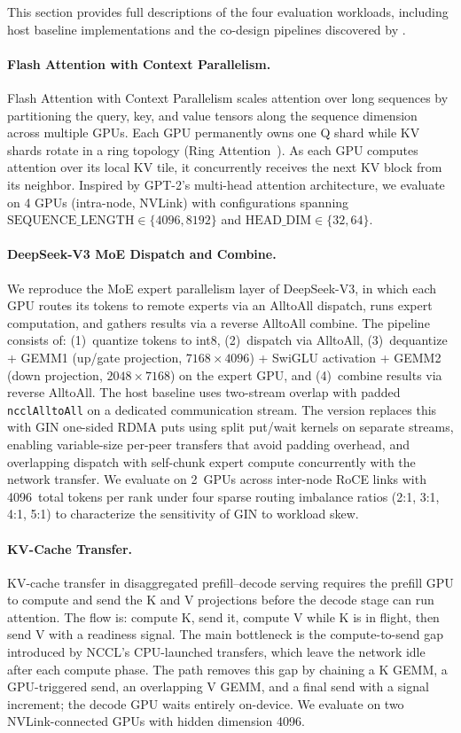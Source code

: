 This section provides full descriptions of the four evaluation workloads, including host baseline implementations and the co-design pipelines discovered by \cufuse{}.

\paragraph{Flash Attention with Context Parallelism.}
Flash Attention with Context Parallelism scales attention over long sequences by partitioning the query, key, and value tensors along the sequence dimension across multiple GPUs. Each GPU permanently owns one Q shard while KV shards rotate in a ring topology (Ring Attention~\cite{liu2024ringattention}). As each GPU computes attention over its local KV tile, it concurrently receives the next KV block from its neighbor. Inspired by GPT-2's multi-head attention architecture, we evaluate on 4 GPUs (intra-node, NVLink) with configurations spanning $\text{SEQUENCE\_LENGTH} \in \{4096, 8192\}$ and $\text{HEAD\_DIM} \in \{32, 64\}$.

\paragraph{DeepSeek-V3 MoE Dispatch and Combine.}
We reproduce the MoE expert parallelism layer of DeepSeek-V3, in which each GPU routes its tokens to remote experts via an AlltoAll dispatch, runs expert computation, and gathers results via a reverse AlltoAll combine. The pipeline consists of: (1)~quantize tokens to int8, (2)~dispatch via AlltoAll, (3)~dequantize + GEMM1 (up/gate projection, $7168 \times 4096$) + SwiGLU activation + GEMM2 (down projection, $2048 \times 7168$) on the expert GPU, and (4)~combine results via reverse AlltoAll. The host baseline uses two-stream overlap with padded \texttt{ncclAlltoAll} on a dedicated communication stream. The \cufuse{} version replaces this with GIN one-sided RDMA puts using split put/wait kernels on separate streams, enabling variable-size per-peer transfers that avoid padding overhead, and overlapping dispatch with self-chunk expert compute concurrently with the network transfer. We evaluate on 2~GPUs across inter-node RoCE links with 4096~total tokens per rank under four sparse routing imbalance ratios (2:1, 3:1, 4:1, 5:1) to characterize the sensitivity of GIN to workload skew.

\paragraph{KV-Cache Transfer.}
KV-cache transfer in disaggregated prefill--decode serving requires the prefill GPU to compute and send the K and V projections before the decode stage can run attention. The flow is: compute K, send it, compute V while K is in flight, then send V with a readiness signal. The main bottleneck is the compute-to-send gap introduced by NCCL's CPU-launched transfers, which leave the network idle after each compute phase. The \cufuse{} path removes this gap by chaining a K GEMM, a GPU-triggered send, an overlapping V GEMM, and a final send with a signal increment; the decode GPU waits entirely on-device. We evaluate on two NVLink-connected GPUs with hidden dimension 4096.

